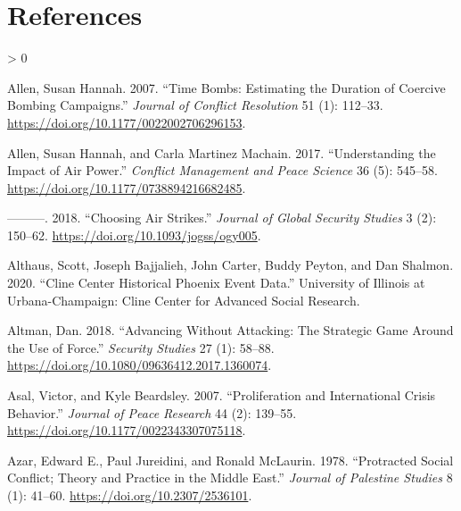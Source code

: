 \documentclass[
]{article}
\newlength{\cslhangindent}
\newenvironment{CSLReferences}[2] %
 {%
  \setlength{\parindent}{0pt}
  \ifodd #1 \everypar{\setlength{\hangindent}{\cslhangindent}}\ignorespaces\fi
  \ifnum #2 > 0
  \setlength{\parskip}{#2\baselineskip}
  \fi
 }%
 {}
\begin{document}
\newpage

\hypertarget{references}{%
\section*{References}\label{references}}

\hypertarget{refs}{}
\begin{CSLReferences}{1}{0}
\leavevmode\hypertarget{ref-allen_timebombsestimating_2007}{}%
Allen, Susan Hannah. 2007. {``Time {Bombs}: {Estimating} the {Duration} of {Coercive Bombing Campaigns}.''} \emph{Journal of Conflict Resolution} 51 (1): 112--33. \url{https://doi.org/10.1177/0022002706296153}.

\leavevmode\hypertarget{ref-allen_understandingimpactair_2017}{}%
Allen, Susan Hannah, and Carla Martinez Machain. 2017. {``Understanding the Impact of Air Power.''} \emph{Conflict Management and Peace Science} 36 (5): 545--58. \url{https://doi.org/10.1177/0738894216682485}.

\leavevmode\hypertarget{ref-allen_choosingairstrikes_2018}{}%
---------. 2018. {``Choosing {Air Strikes}.''} \emph{Journal of Global Security Studies} 3 (2): 150--62. \url{https://doi.org/10.1093/jogss/ogy005}.

\leavevmode\hypertarget{ref-althaus_clinecenterhistorical_2020}{}%
Althaus, Scott, Joseph Bajjalieh, John Carter, Buddy Peyton, and Dan Shalmon. 2020. {``Cline {Center Historical Phoenix Event Data}.''} {University of Illinois at Urbana-Champaign}: {Cline Center for Advanced Social Research}.

\leavevmode\hypertarget{ref-altman_advancingattackingstrategic_2018}{}%
Altman, Dan. 2018. {``Advancing Without {Attacking}: {The Strategic Game} Around the {Use} of {Force}.''} \emph{Security Studies} 27 (1): 58--88. \url{https://doi.org/10.1080/09636412.2017.1360074}.

\leavevmode\hypertarget{ref-asal_proliferationinternationalcrisis_2007}{}%
Asal, Victor, and Kyle Beardsley. 2007. {``Proliferation and {International Crisis Behavior}.''} \emph{Journal of Peace Research} 44 (2): 139--55. \url{https://doi.org/10.1177/0022343307075118}.

\leavevmode\hypertarget{ref-azar_protractedsocialconflict_1978}{}%
Azar, Edward E., Paul Jureidini, and Ronald McLaurin. 1978. {``Protracted {Social Conflict}; {Theory} and {Practice} in the {Middle East}.''} \emph{Journal of Palestine Studies} 8 (1): 41--60. \url{https://doi.org/10.2307/2536101}.


\end{CSLReferences}
\end{document}
